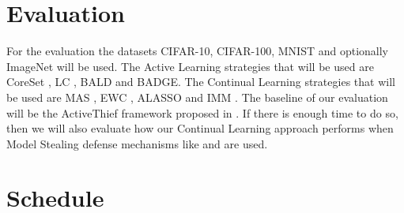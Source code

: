 \documentclass[expose, en]{thesis}
\begin{document}
\section{Evaluation}
For the evaluation the datasets CIFAR-10, CIFAR-100, MNIST and optionally ImageNet will be used. The Active Learning strategies that will be used are
CoreSet \cite{sener2017active}, LC \cite{lewis1995sequential}, BALD \cite{gal2017deep} and BADGE. The Continual Learning strategies that will be used are MAS \cite{aljundi2018memory},
EWC \cite{kirkpatrick2017overcoming}, ALASSO \cite{park2019continual} and IMM \cite{lee2017overcoming}. The baseline of our evaluation will be the ActiveThief
framework proposed in \cite{pal2020activethief}. If there is enough time to do so, then we will also evaluate how our Continual Learning approach performs
when Model Stealing defense mechanisms like \cite{juuti2019prada} and \cite{orekondy2019prediction} are used.

\clearpage
\section{Schedule}

\end{document}
